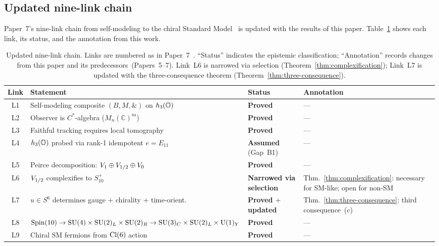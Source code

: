 \subsection{Updated nine-link chain}\label{sec:updated-chain}

Paper~7's nine-link chain from self-modeling to the chiral Standard
Model~\cite{Paper7} is updated with the results of this paper.
Table~\ref{tab:chain} shows each link, its status, and the
annotation from this work.

\begin{table}[t]
  \centering
  \caption{Updated nine-link chain.  Links are numbered as in
  Paper~7~\cite{Paper7}.  ``Status'' indicates the epistemic
  classification; ``Annotation'' records changes from this paper and
  its predecessors~(Papers~5--7).  Link~L6 is narrowed via selection
  (Theorem~\ref{thm:complexification}); Link~L7 is updated with the
  three-consequence theorem
  (Theorem~\ref{thm:three-consequence}).}
  \label{tab:chain}
  \begin{tabular}{clll}
    \toprule
    Link & Statement & Status & Annotation \\
    \midrule
    L1 & Self-modeling composite $(B,M,\mathbin{\&})$ on $h_3(\mathbb{O})$
       & \textbf{Proved} \cite{Paper5}
       & --- \\
    L2 & Observer is $C^*$-algebra ($M_n(\mathbb{C})^{\mathrm{sa}}$)
       & \textbf{Proved} \cite{Paper5}
       & --- \\
    L3 & Faithful tracking requires local tomography
       & \textbf{Proved} \cite{Paper5}
       & --- \\
    L4 & $h_3(\mathbb{O})$ probed via rank-1 idempotent $e = E_{11}$
       & \textbf{Assumed} (Gap~B1)
       & --- \\
    L5 & Peirce decomposition: $V_1 \oplus V_{1/2} \oplus V_0$
       & \textbf{Proved} \cite{Paper7}
       & --- \\
    L6 & $V_{1/2}$ complexifies to $S_{10}^+$
       & \textbf{Narrowed via selection}
       & Thm.~\ref{thm:complexification}: necessary
         for SM-like; open for non-SM \\
    L7 & $u \in S^6$ determines gauge $+$ chirality
         $+$ time-orient.
       & \textbf{Proved $+$ updated}
       & Thm.~\ref{thm:three-consequence}: third
         consequence~(c) \\
    L8 & $\mathrm{Spin}(10) \to \mathrm{SU}(4) \times \mathrm{SU}(2)_L \times \mathrm{SU}(2)_R \to \mathrm{SU}(3)_C \times \mathrm{SU}(2)_L \times \mathrm{U}(1)_Y$
       & \textbf{Proved} \cite{Paper7}
       & --- \\
    L9 & Chiral SM fermions from $\mathrm{Cl}(6)$ action
       & \textbf{Proved} \cite{Paper7}
       & --- \\
    \bottomrule
  \end{tabular}
\end{table}

